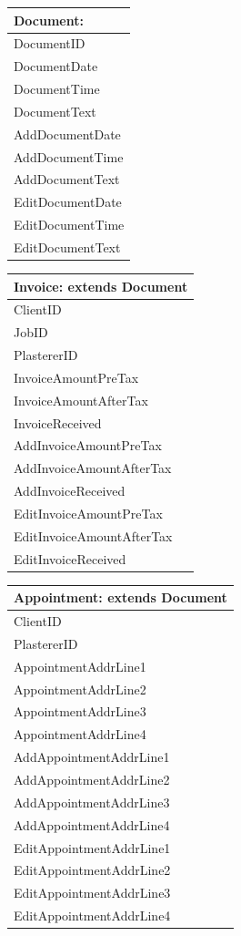 \begin{tabular}{|p{5cm}|}
	\hline
	\textbf{Document:} \\ \hline
		DocumentID \\
		DocumentDate \\
		DocumentTime \\
		DocumentText \\ \hline
		AddDocumentDate \\
		AddDocumentTime \\
		AddDocumentText \\
		EditDocumentDate \\
		EditDocumentTime \\
		EditDocumentText \\ \hline
		
\end{tabular}


\begin{tabular}{|p{5cm}|}
	\hline
	\textbf{Invoice:} extends \textbf{Document} \\ \hline
		ClientID \\
		JobID \\
		PlastererID\\
		InvoiceAmountPreTax \\
		InvoiceAmountAfterTax \\
		InvoiceReceived \\ \hline
		AddInvoiceAmountPreTax \\ 
		AddInvoiceAmountAfterTax \\
		AddInvoiceReceived \\
		EditInvoiceAmountPreTax \\ 
		EditInvoiceAmountAfterTax \\
		EditInvoiceReceived \\ \hline
		
\end{tabular}

\begin{tabular}{|p{5cm}|}
	\hline
	\textbf{Appointment:} extends \textbf{Document} \\ \hline
		ClientID \\
		PlastererID \\
		AppointmentAddrLine1 \\
		AppointmentAddrLine2 \\
		AppointmentAddrLine3 \\
		AppointmentAddrLine4 \\ \hline
		AddAppointmentAddrLine1 \\
		AddAppointmentAddrLine2 \\
		AddAppointmentAddrLine3 \\
		AddAppointmentAddrLine4 \\
		EditAppointmentAddrLine1 \\
		EditAppointmentAddrLine2 \\
		EditAppointmentAddrLine3 \\
		EditAppointmentAddrLine4 \\ \hline

\end{tabular}

